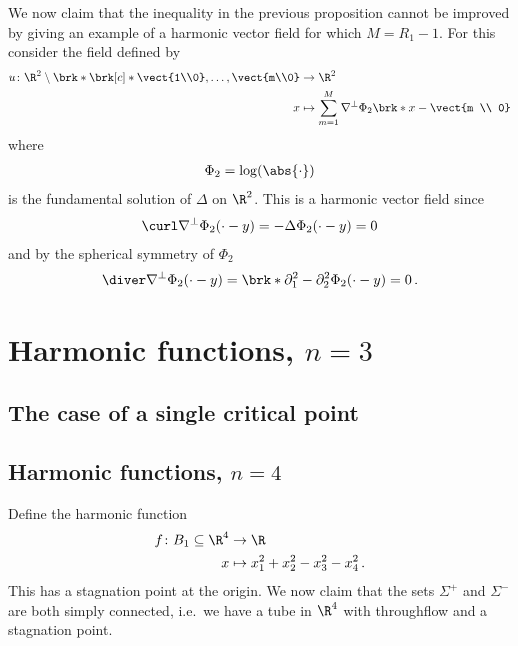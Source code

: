 We now claim that the inequality in the previous proposition cannot be improved by giving an example of a harmonic vector field
for which $M=R_1-1$.
For this consider the field defined by
\begin{align*}
  u\colon\R^2\setminus\brk*{\brk[c]*{\vect{1\\0},\dots,\vect{m\\0}}}&\to\R^2 \\
  x&\mapsto\sum_{m=1}^M\nabla^\perp\Phi_2\brk*{x-\vect{m \\ 0}}
\end{align*}
where
\begin{align*}
  \Phi_2=\log(\abs{\cdot})
\end{align*}
is the fundamental solution of $\Delta$ on $\R^2$. This is a harmonic vector field since
\begin{align*}
  \curl \nabla^\perp\Phi_2(\cdot-y)= -\Delta\Phi_2(\cdot-y)=0
\end{align*}
and by the spherical symmetry of $\Phi_2$
\begin{align*}
  \diver \nabla^\perp\Phi_2(\cdot-y) = \brk*{\partial_1^2-\partial_2^2}\Phi_2(\cdot-y)=0\,.
\end{align*}

\section*{Harmonic functions, $n=3$}

\subsection*{The case of a single critical point}

\newpage

\subsection*{Harmonic functions, $n=4$} 
Define the harmonic function 
\begin{align*}
  f\colon B_1\subseteq\R^4&\to \R \\
  x &\mapsto x_1^2+x_2^2-x_3^2-x_4^2\,.
\end{align*}
This has a stagnation point at the origin. We now claim that the sets $\Sigma^+$ and $\Sigma^-$ are both simply connected, i.e.\
we have a tube in $\R^4$ with throughflow and a stagnation point.

